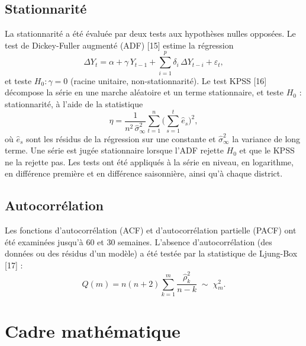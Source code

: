 \documentclass[11pt]{article}
\begin{document}
\subsection{Stationnarité}
La stationnarité a été évaluée par deux tests aux hypothèses nulles opposées. Le test de Dickey-Fuller augmenté (ADF) [15] estime la régression
\begin{equation}
\Delta Y_t=\alpha+\gamma\,Y_{t-1}+\sum_{i=1}^{p}\delta_i\,\Delta Y_{t-i}+\varepsilon_t ,
\label{eq:adf}
\end{equation}
et teste $H_0:\gamma=0$ (racine unitaire, non-stationnarité). Le test KPSS [16] décompose la série en une marche aléatoire et un terme stationnaire, et teste $H_0$ : stationnarité, à l'aide de la statistique
\begin{equation}
\eta=\frac{1}{n^{2}\,\hat{\sigma}^{2}_{\infty}}\sum_{t=1}^{n}\Big(\sum_{s=1}^{t}\hat{e}_s\Big)^{2},
\label{eq:kpss}
\end{equation}
où $\hat{e}_s$ sont les résidus de la régression sur une constante et $\hat{\sigma}^{2}_{\infty}$ la variance de long terme. Une série est jugée stationnaire lorsque l'ADF rejette $H_0$ et que le KPSS ne la rejette pas. Les tests ont été appliqués à la série en niveau, en logarithme, en différence première et en différence saisonnière, ainsi qu'à chaque district.

\subsection{Autocorrélation}
Les fonctions d'autocorrélation (ACF) et d'autocorrélation partielle (PACF) ont été examinées jusqu'à 60 et 30 semaines. L'absence d'autocorrélation (des données ou des résidus d'un modèle) a été testée par la statistique de Ljung-Box [17] :
\begin{equation}
Q(m)=n(n+2)\sum_{k=1}^{m}\frac{\hat{\rho}_k^{2}}{n-k}\;\sim\;\chi^{2}_{m} .
\label{eq:lb}
\end{equation}

\section{Cadre mathématique}
\end{document}
